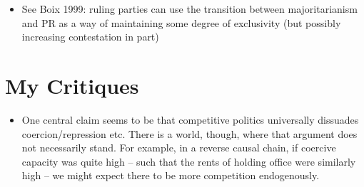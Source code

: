 \documentclass[12pt]{article}
\begin{document}
\begin{itemize}
\begin{enumerate}
        \item Consistency w/ beliefs: are the new beliefs consistent with the individual's present beliefs? Tautologically, there must be some separation for this to be a meaningful shift, but are they aligned in principle or entirely separated? Do they fit into a common worldview and perhaps merely offer a differential explanation? (RG note: this could largely be tied to religious impacts on political beliefs, most notably Catholicism in modern western politics)
        \item Consistency w/ experience: are the new beliefs consistent with the policy-related (or even simply emotional) experiences the subject has endured? Do they align with previous needs/wants/solutions
    \end{enumerate}
    \item See Boix 1999: ruling parties can use the transition between majoritarianism and PR as a way of maintaining some degree of exclusivity (but possibly increasing contestation in part)
\end{itemize}


\section{My Critiques}

\begin{itemize}
    \item One central claim seems to be that competitive politics universally dissuades coercion/repression etc. There is a world, though, where that argument does not necessarily stand. For example, in a reverse causal chain, if coercive capacity was quite high -- such that the rents of holding office were similarly high -- we might expect there to be more competition endogenously.
\end{itemize}
\end{document}
